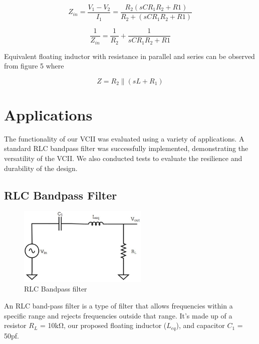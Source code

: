 \documentclass{./styles/svproc}
\begin{document}
\begin{equation}\label{eq:4.3}
Z_{in}=\frac{V_1-V_2}{I_1} = \frac{R_2(sCR_1R_2+R1)}{R_2+(sCR_1R_2+R1)}
\end{equation}

\begin{equation}\label{eq:4.4}
\frac{1}{Z_{in}}= \frac{1}{R_2}+\frac{1}{sCR_1R_2+R1}
\end{equation}

Equivalent floating inductor with resistance in parallel and series can be observed from figure 5 where

\begin{equation}\label{eq:3.4}
{Z} = {R_2}\parallel{(sL+R_1)}
\end{equation}

\section{Applications}
The functionality of our VCII was evaluated using a variety of applications. A standard RLC bandpass filter was successfully implemented, demonstrating the versatility of the VCII. We also conducted tests to evaluate the resilience and durability of the design.

\subsection{RLC Bandpass Filter}\label{AA}
\begin{figure}[h]
\includegraphics[width=0.55\textwidth]{application1.jpg}
\centering
\caption{RLC Bandpass filter}
\end{figure}
An RLC band-pass filter is a type of filter that allows frequencies within a specific range and rejects frequencies outside that range. It’s made up of a resistor $R_L$ = 10k$\si{\ohm}$, our proposed floating inductor ($L_{eq}$), and capacitor $C_1$ = 50pf.
\end{document}
